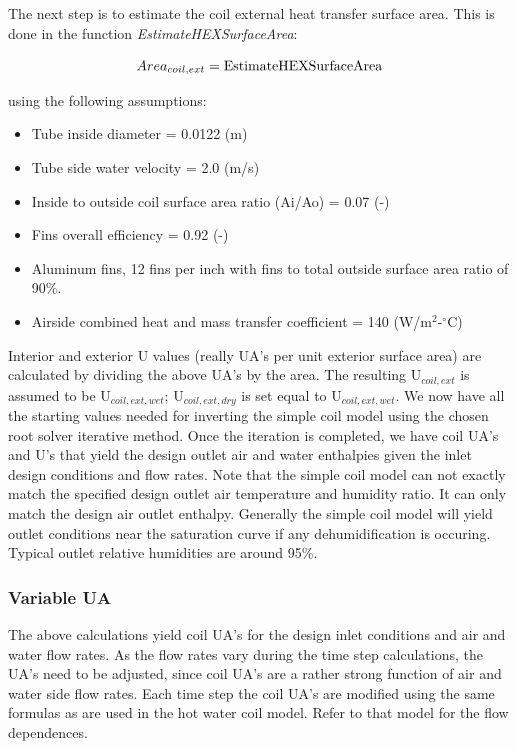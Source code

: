 The next step is to estimate the coil external heat transfer surface area. This is done in the function \emph{EstimateHEXSurfaceArea}:

\begin{equation}
Are{a_{coil,ext}} = {\rm{EstimateHEXSurfaceArea}}
\end{equation}

using the following assumptions:

\begin{itemize}
\item
  Tube inside diameter = 0.0122 (m)
\item
  Tube side water velocity = 2.0 (m/s)
\item
  Inside to outside coil surface area ratio (Ai/Ao) = 0.07 (-)
\item
  Fins overall efficiency = 0.92 (-)
\item
  Aluminum fins, 12 fins per inch with fins to total outside surface area ratio of 90\%.
\item
  Airside combined heat and mass transfer coefficient = 140 (W/m\(^2\)-\(^{\circ}\)C)
\end{itemize}

Interior and exterior U values (really UA's per unit exterior surface area) are calculated by dividing the above UA's by the area. The resulting U\(_{coil,ext}\) is assumed to be U\(_{coil,ext,wet}\); U\(_{coil,ext,dry}\) is set equal to U\(_{coil,ext,wet}\). We now have all the starting values needed for inverting the simple coil model using the chosen root solver iterative method. Once the iteration is completed, we have coil UA's and U's that yield the design outlet air and water enthalpies given the inlet design conditions and flow rates. Note that the simple coil model can not exactly match the specified design outlet air temperature and humidity ratio. It can only match the design air outlet enthalpy. Generally the simple coil model will yield outlet conditions near the saturation curve if any dehumidification is occuring. Typical outlet relative humidities are around 95\%.

\subsubsection{Variable UA}\label{variable-ua}

The above calculations yield coil UA's for the design inlet conditions and air and water flow rates. As the flow rates vary during the time step calculations, the UA's need to be adjusted, since coil UA's are a rather strong function of air and water side flow rates. Each time step the coil UA's are modified using the same formulas as are used in the hot water coil model. Refer to that model for the flow dependences.

